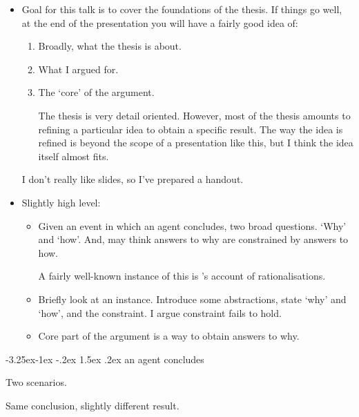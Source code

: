 \documentclass[10pt]{article}
\makeatletter
\renewcommand\paragraph{\@startsection{paragraph}{4}{\z@}%
  {-3.25ex\@plus -1ex \@minus -.2ex}%
  {1.5ex \@plus .2ex}%
  {\normalfont\normalsize\bfseries}}
\makeatother
\begin{document}
\begin{note}
  \begin{itemize}
  \item
    Goal for this talk is to cover the foundations of the thesis.
    If things go well, at the end of the presentation you will have a fairly good idea of:
    \begin{enumerate}
    \item
      Broadly, what the thesis is about.
    \item
      What I argued for.
    \item
      The `core' of the argument.

      The thesis is very detail oriented.
      However, most of the thesis amounts to refining a particular idea to obtain a specific result.
      The way the idea is refined is beyond the scope of a presentation like this, but I think the idea itself almost fits.
    \end{enumerate}

    I don't really like slides, so I've prepared a handout.
  \item
    Slightly high level:
    \begin{itemize}
    \item 
      Given an event in which an agent concludes, two broad questions.
      `Why' and `how'.
      And, may think answers to why are constrained by answers to how.

      A fairly well-known instance of this is \citeauthor{Davidson:1963aa}'s account of rationalisations.
    \item
      Briefly look at an instance.
      Introduce some abstractions, state `why' and `how', and the constraint.
      I argue constraint fails to hold.
    \item
      Core part of the argument is a way to obtain answers to why.
    \end{itemize}
  \end{itemize}
\end{note}

\paragraph{ an agent concludes}

\begin{note}
  Two scenarios.

  Same conclusion, slightly different result.
\end{note}
\end{document}
